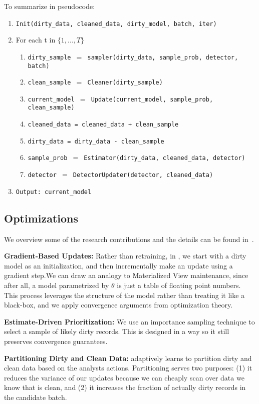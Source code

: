   \noindent To summarize in pseudocode:
  \begin{enumerate}[leftmargin=1em]\scriptsize\sloppy
  \item \texttt{Init(dirty\_data, cleaned\_data, dirty\_model, batch, iter)}
  \item For each t in $\{1,...,T\}$
  \begin{enumerate}
    \item \texttt{dirty\_sample $=$ sampler(dirty\_data, sample\_prob, detector, batch)}
    \item \texttt{clean\_sample $=$ Cleaner(dirty\_sample)}
    \item \texttt{current\_model $=$ Update(current\_model, sample\_prob, clean\_sample)}
    \item \texttt{cleaned\_data = cleaned\_data + clean\_sample}
    \item \texttt{dirty\_data = dirty\_data - clean\_sample}
    \item \texttt{sample\_prob $=$ Estimator(dirty\_data, cleaned\_data, detector)}
    \item \texttt{detector $=$ DetectorUpdater(detector, cleaned\_data)}
  \end{enumerate}
  \item \texttt{Output: current\_model}
  \end{enumerate}

\subsection{Optimizations}
We overview some of the research contributions and the details can be found in~\cite{activecleanarxiv}.

  \vspace{0.5em}

  \noindent\textbf{Gradient-Based Updates: } Rather than retraining, in \sys, we start with a dirty model as an initialization, and then incrementally make an update using a gradient step.We can draw an analogy to Materialized View maintenance, since after all, a model parametrized by $\theta$ is just a table of floating point numbers.
  This process leverages the structure of the model rather than treating it like a black-box, and we apply convergence arguments from optimization theory.

  \vspace{0.5em}

  \noindent\textbf{Estimate-Driven Prioritization: } We use an importance sampling technique to select a sample of likely dirty records. This is designed in a way so it still preserves convergence guarantees.

  \vspace{0.5em}

  \noindent\textbf{Partitioning Dirty and Clean Data: } \sys adaptively learns to partition dirty and clean data based on the analysts actions.
  Partitioning serves two purposes: (1) it reduces the variance of our updates because we can cheaply scan over data we know that is clean, and (2) it increases the fraction of actually dirty records in the candidate batch.
